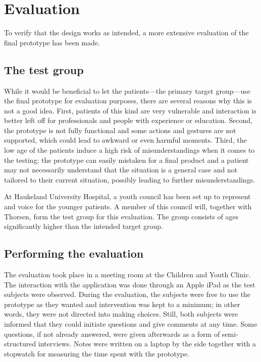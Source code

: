 \chapter{Evaluation}
\label{ch:evaluation}

To verify that the design works as intended, a more extensive evaluation of the final prototype has been made.

\section{The test group}
\label{sec:testgroup}

While it would be beneficial to let the patients---the primary target group---use the final prototype for evaluation purposes, there are several reasons why this is not a good idea. First, patients of this kind are very vulnerable and interaction is better left off for professionals and people with experience or education. Second, the prototype is not fully functional and some actions and gestures are not supported, which could lead to awkward or even harmful moments. Third, the low age of the patients induce a high risk of misunderstandings when it comes to the testing; the prototype can easily mistaken for a final product and a patient may not necessarily understand that the situation is a general case and not tailored to their current situation, possibly leading to further misunderstandings.

At Haukeland University Hospital, a youth council has been set up to represent and voice for the younger patients. A member of this council will, together with Thorsen, form the test group for this evaluation. The group consists of ages significantly higher than the intended target group.


\section{Performing the evaluation}


The evaluation took place in a meeting room at the Children and Youth Clinic. The interaction with the application was done through an Apple iPad as the test subjects were observed. During the evaluation, the subjects were free to use the prototype as they wanted and intervention was kept to a minimum; in other words, they were not directed into making choices. Still, both subjects were informed that they could initiate questions and give comments at any time. Some questions, if not already answered, were given afterwards as a form of semi-structured interviews. Notes were written on a laptop by the side together with a stopwatch for measuring the time spent with the prototype.

